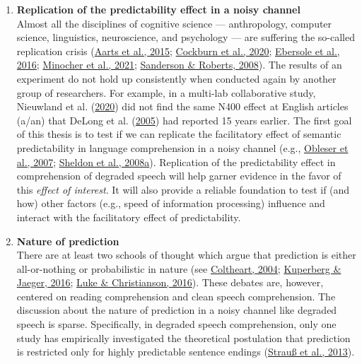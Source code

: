\documentclass[a4paper, nobind]{templates/ociamthesis}
\begin{document}
\begin{enumerate}
\def\labelenumi{(\arabic{enumi})}
\item
  \textbf{Replication of the predictability effect in a noisy channel}\\
  Almost all the disciplines of cognitive science --- anthropology, computer science, linguistics, neuroscience, and psychology --- are suffering the so-called replication crisis (\protect\hyperlink{ref-OSC2015}{Aarts et al., 2015}; \protect\hyperlink{ref-Cockburn2020}{Cockburn et al., 2020}; \protect\hyperlink{ref-Ebersole2016}{Ebersole et al., 2016}; \protect\hyperlink{ref-Minocher2021}{Minocher et al., 2021}; \protect\hyperlink{ref-Sanderson2008}{Sanderson \& Roberts, 2008}).
  The results of an experiment do not hold up consistently when conducted again by another group of researchers.
  For example, in a multi-lab collaborative study, Nieuwland et al. (\protect\hyperlink{ref-Nieuwland2020a}{2020}) did not find the same N400 effect at English articles (a/an) that DeLong et al. (\protect\hyperlink{ref-Delong2005}{2005}) had reported 15 years earlier.
  The first goal of this thesis is to test if we can replicate the facilitatory effect of semantic predictability in language comprehension in a noisy channel (e.g., \protect\hyperlink{ref-Obleser2007}{Obleser et al., 2007}; \protect\hyperlink{ref-Sheldon2008a}{Sheldon et al., 2008a}).
  Replication of the predictability effect in comprehension of degraded speech
  will help garner evidence in the favor of this \emph{effect of interest}.
  It will also provide a reliable foundation to test if (and how) other factors (e.g., speed of information processing) influence and interact with the facilitatory effect of predictability.
\item
  \textbf{Nature of prediction}\\
  There are at least two schools of thought which argue that prediction is either all-or-nothing or probabilistic in nature (see \protect\hyperlink{ref-Coltheart2004}{Coltheart, 2004}; \protect\hyperlink{ref-Kuperberg2016}{Kuperberg \& Jaeger, 2016}; \protect\hyperlink{ref-Luke2016}{Luke \& Christianson, 2016}).
  These debates are, however, centered on reading comprehension and clean speech comprehension.
  The discussion about the nature of prediction in a noisy channel like degraded speech is sparse.
  Specifically, in degraded speech comprehension, only one study has empirically investigated the theoretical postulation that prediction is restricted only for highly predictable sentence endings (\protect\hyperlink{ref-Strauss2013}{Strauß et al., 2013}).

\end{enumerate}
\end{document}
